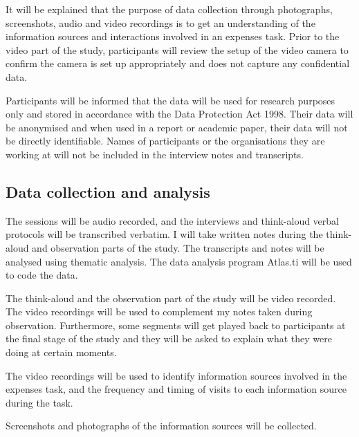 \documentclass[11pt,oneside]{report}
\begin{document}
It will be explained that the purpose of data collection through photographs, screenshots, audio and video recordings  is to get an understanding of the information sources and interactions involved in an expenses task. Prior to the video part of the study, participants will review the setup of the video camera to confirm the camera is set up appropriately and does not capture any confidential data.

Participants will be informed that the data will be used for research purposes only and stored in accordance with the Data Protection Act 1998. Their data will be anonymised and when used in a report or academic paper, their data will not be directly identifiable. Names of participants or the organisations they are working at will not be included in the interview notes and transcripts.

\subsection{Data collection and analysis}
The sessions will be audio recorded, and the interviews and think-aloud verbal protocols will be transcribed verbatim. I will take written notes during the think-aloud and observation parts of the study. The transcripts and notes will be analysed using thematic analysis. The data analysis program Atlas.ti will be used to code the data. 

The think-aloud and the observation part of the study will be video recorded. The video recordings will be used to complement my notes taken during observation. Furthermore, some segments will get played back to participants at the final stage of the study and they will be asked to explain what they were doing at certain moments.

The video recordings will be used to identify information sources involved in the expenses task, and the frequency and timing of visits to each information source during the task.

Screenshots and photographs of the information sources will be collected.
\end{document}
